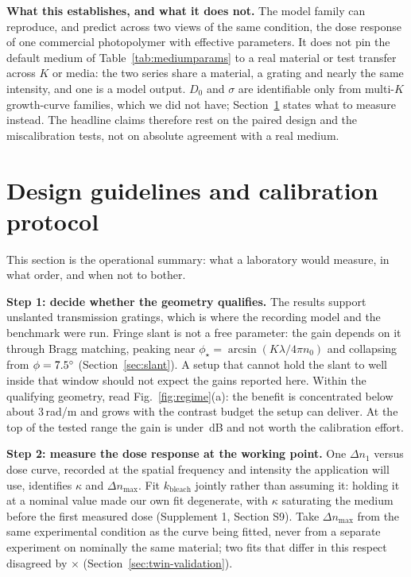 \documentclass{optica-article}
\begin{document}
\textbf{What this establishes, and what it does not.} The model family can
reproduce, and predict across two views of the same condition, the dose
response of one commercial photopolymer with effective parameters. It does not
pin the default medium of Table~\ref{tab:mediumparams} to a real material or
test transfer across $K$ or media: the two series share a material, a grating
and nearly the same intensity, and one is a model output. $D_0$ and $\sigma$
are identifiable only from multi-$K$ growth-curve families, which we did not
have; Section~\ref{sec:guidelines} states what to measure instead. The headline
claims therefore rest on the paired design and the miscalibration tests, not on
absolute agreement with a real medium.

\section{Design guidelines and calibration protocol}
\label{sec:guidelines}
This section is the operational summary: what a laboratory would measure,
in what order, and when not to bother.

\textbf{Step 1: decide whether the geometry qualifies.} The results support
unslanted transmission gratings, which is where the recording model and the
benchmark were run. Fringe slant is not a free parameter: the gain depends on
it through Bragg matching, peaking near
$\phi_\star=\arcsin(K\lambda/4\pi n_0)$ and collapsing from
$\phi=7.5^\circ$ (Section~\ref{sec:slant}). A setup that cannot
hold the slant to well inside that window should not expect the gains reported
here. Within the qualifying geometry, read
Fig.~\ref{fig:regime}(a): the benefit is concentrated below about
$3$\,rad/\textmu m and grows with the contrast budget the setup can deliver. At
the top of the tested range the gain is under \GainHighKEightX\,dB and not
worth the calibration effort.

\textbf{Step 2: measure the dose response at the working point.} One
$\Delta n_1$ versus dose curve, recorded at the spatial frequency and intensity
the application will use, identifies $\kappa$ and $\Delta n_{\max}$. Fit
$k_{\text{bleach}}$ jointly rather than assuming it: holding it at a nominal
value made our own fit degenerate, with $\kappa$ saturating the medium before
the first measured dose (Supplement 1, Section S9). Take $\Delta n_{\max}$ from
the same experimental condition as the curve being fitted, never from a
separate experiment on nominally the same material; two fits that differ in
this respect disagreed by \BayfolDnMaxRatio$\times$
(Section~\ref{sec:twin-validation}).
\end{document}
